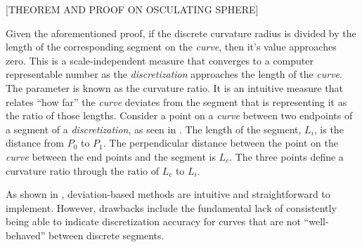 [THEOREM AND PROOF ON OSCULATING SPHERE]

Given the aforementioned proof, if the discrete curvature radius is
divided by the length of the corresponding segment on the
\textit{curve}, then it’s value approaches zero. This is a
scale-independent measure that converges to a computer representable
number as the \textit{discretization} approaches the length of the
\textit{curve}. The parameter is known as the curvature ratio. It is an
intuitive measure that relates ``how far'' the \textit{curve} deviates
from the segment that is representing it as the ratio of those lengths.
Consider a point on a \textit{curve} between two endpoints of a segment
of a \textit{discretization}, as seen in . The
length of the segment, $L_i$, is the distance from $P_0$ to $P_1$. The
perpendicular distance between the point on the \textit{curve} between
the end points and the segment is $L_c$. The three points define a
curvature ratio through the ratio of $L_c$ to $L_i$.


 As shown in \cite{mclaurin12}, deviation-based methods are
intuitive and straightforward to implement. However, drawbacks include
the fundamental lack of consistently being able to indicate
discretization accuracy for curves that are not ``well-behaved'' between
discrete segments.

